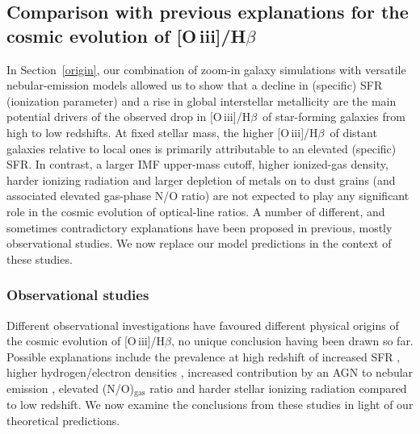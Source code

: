 \documentclass[fleqn,usenatbib]{mnras}
\newcommand{\oiiihb}{\hbox{[O\,{\sc iii}]/H$\beta$}}
\begin{document}
\subsection{Comparison with previous explanations for the cosmic evolution of \oiiihb}\label{comparison}  

In Section~\ref{origin}, our combination of zoom-in galaxy simulations
with versatile  nebular-emission models allowed us to show that a
decline in (specific) SFR (ionization parameter) and a rise in global
interstellar metallicity are the main potential drivers of the
observed drop in \oiiihb\ of star-forming galaxies from high to low
redshifts. At fixed stellar mass, the  higher \oiiihb\ of distant
galaxies relative to local ones is primarily attributable to an
elevated (specific) SFR. In contrast, a larger IMF upper-mass cutoff,
higher ionized-gas density, harder ionizing radiation and larger
depletion of metals on to dust grains (and  associated elevated
gas-phase N/O ratio) are not expected to play any significant role in
the cosmic evolution of optical-line ratios. A number of different,
and sometimes contradictory explanations have been proposed in
previous, mostly observational  studies. We now replace our model
predictions in the context of these studies. 

\subsubsection{Observational studies}\label{obstudies}

Different observational investigations have favoured different
physical origins  of the cosmic evolution of \oiiihb, no unique
conclusion having been  drawn so far. Possible explanations include
 the prevalence at high redshift of increased SFR
\citep[e.g.,][]{Kashino17}, higher hydrogen/electron densities
\citep[e.g.,][]{Brinchmann08, Lehnert09}, increased  contribution by an
AGN to nebular emission \citep[e.g.,][]{Wright10}, elevated
(N/O)$_\mathrm{gas}$  ratio \citep[e.g.,][]{Shapley15}  and harder
stellar ionizing radiation \citep[e.g.,][]{Steidel14, Strom17} compared to
low redshift. We now examine the conclusions from these studies in
light of our theoretical predictions. 
\end{document}
